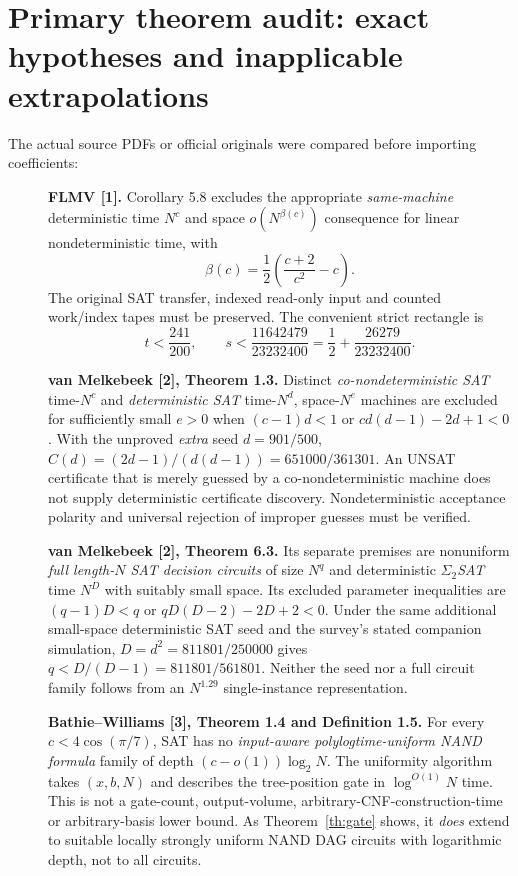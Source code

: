 \documentclass[11pt]{article}
\begin{document}
\section{Primary theorem audit: exact hypotheses and inapplicable extrapolations}
The actual source PDFs or official originals were compared before importing coefficients:
\begin{description}
\item[] \textbf{FLMV [1].} Corollary 5.8 excludes the appropriate \emph{same-machine} deterministic time $N^c$ and space $o(N^{\beta(c)})$ consequence for linear nondeterministic time, with
\[
\beta(c)=\frac12\left(\frac{c+2}{c^2}-c\right).
\]
The original SAT transfer, indexed read-only input and counted work/index tapes must be preserved. The convenient strict rectangle is
\[
t<\frac{241}{200},\qquad s<\frac{11642479}{23232400}
=\frac12+\frac{26279}{23232400}.
\]
\item[] \textbf{van Melkebeek [2], Theorem 1.3.} Distinct \emph{co-nondeterministic SAT} time-$N^c$ and \emph{deterministic SAT} time-$N^d$, space-$N^e$ machines are excluded for sufficiently small $e>0$ when $(c-1)d<1$ or $cd(d-1)-2d+1<0$. With the unproved \emph{extra} seed $d=901/500$, $C(d)=(2d-1)/(d(d-1))=651000/361301$. An UNSAT certificate that is merely guessed by a co-nondeterministic machine does not supply deterministic certificate discovery. Nondeterministic acceptance polarity and universal rejection of improper guesses must be verified.
\item[] \textbf{van Melkebeek [2], Theorem 6.3.} Its separate premises are nonuniform \emph{full length-$N$ SAT decision circuits} of size $N^q$ and deterministic \emph{$\Sigma_2$SAT} time $N^D$ with suitably small space. Its excluded parameter inequalities are $(q-1)D<q$ or $qD(D-2)-2D+2<0$. Under the same additional small-space deterministic SAT seed and the survey's stated companion simulation, $D=d^2=811801/250000$ gives $q<D/(D-1)=811801/561801$. Neither the seed nor a full circuit family follows from an $N^{1.29}$ single-instance representation.
\item[] \textbf{Bathie--Williams [3], Theorem 1.4 and Definition 1.5.} For every $c<4\cos(\pi/7)$, SAT has no \emph{input-aware polylogtime-uniform NAND formula} family of depth $(c-o(1))\log_2N$. The uniformity algorithm takes $(x,b,N)$ and describes the tree-position gate in $\log^{O(1)}N$ time. This is not a gate-count, output-volume, arbitrary-CNF-construction-time or arbitrary-basis lower bound. As Theorem~\ref{th:gate} shows, it \emph{does} extend to suitable locally strongly uniform NAND DAG circuits with logarithmic depth, not to all circuits.

\end{description}
\end{document}
